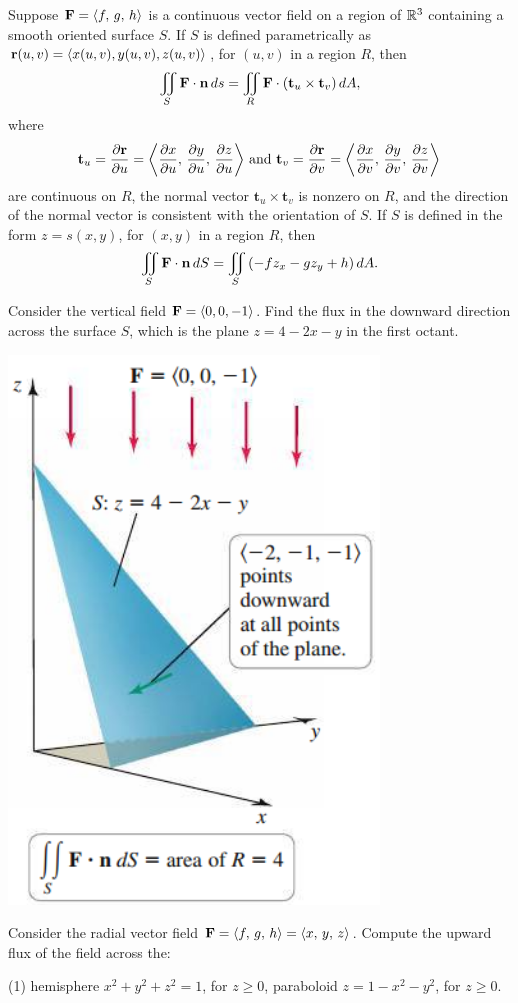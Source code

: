 \documentclass[../mathNotesPreamble]{subfiles}
\begin{document}
  \begin{defn*}
    Suppose $\mathbf F={\left\langle f,\,g,\,h \right\rangle}$ is a continuous vector field on a region of $\mathbb{R}^3$ containing a smooth oriented surface $S$. If $S$ is defined parametrically as ${\mathbf{r}}(u,v)={\left\langle x(u,v),y(u,v),z(u,v) \right\rangle}$, for $(u,v)$ in a region $R$, then
      \[\iint\limits_S \mathbf F\cdot{\mathbf{n}}\,ds = \iint\limits_R \mathbf F\cdot{\left(\mathbf t_u\times\mathbf t_v\right)}\,dA,\]
    where 
      \[\displaystyle\mathbf t_u=\frac{\partial {\mathbf{r}}}{\partial u}={\left\langle \frac{\partial x}{\partial u},\,\frac{\partial y}{\partial u},\,\frac{\partial z}{\partial u} \right\rangle}
      \textnormal{ and }
      \displaystyle\mathbf t_v=\frac{\partial {\mathbf{r}}}{\partial v}={\left\langle \frac{\partial x}{\partial v},\,\frac{\partial y}{\partial v},\,\frac{\partial z}{\partial v} \right\rangle}\] 
    are continuous on $R$, the normal vector $\mathbf t_u\times\mathbf t_v$ is nonzero on $R$, and the direction of the normal vector is consistent with the orientation of $S$. If $S$ is defined in the form $z=s(x,y)$, for $(x,y)$ in a region $R$, then 
      \[\iint\limits_S \mathbf F\cdot{\mathbf{n}}\,dS=\iint\limits_S {\left(-fz_x-gz_y+h\right)}\,dA.\]
  \end{defn*}
  \pagebreak

  \begin{ex*}
    Consider the vertical field $\mathbf F={\left\langle 0,0,-1 \right\rangle}$. Find the flux in the downward direction across the surface $S$, which is the plane $z=4-2x-y$ in the first octant.
  \end{ex*}
  \begin{flushright}
    \includegraphics[width=0.25\linewidth]{../images/briggs_17_06/fig17_58}
  \end{flushright}
  \pagebreak

  \begin{ex*}
    Consider the radial vector field $\mathbf F={\left\langle f,\,g,\,h \right\rangle}={\left\langle x,\,y,\,z \right\rangle}$.  Compute the upward flux of the field across the:
  \end{ex*}
  \begin{tasks}[after-item-skip=\stretch{1}, label=](1)
    \task hemisphere $x^2+y^2+z^2=1$, for $z\geq 0$,
    \task paraboloid $z=1-x^2-y^2$, for $z\geq 0$.
  \end{tasks}
  \pagebreak
\end{document}
